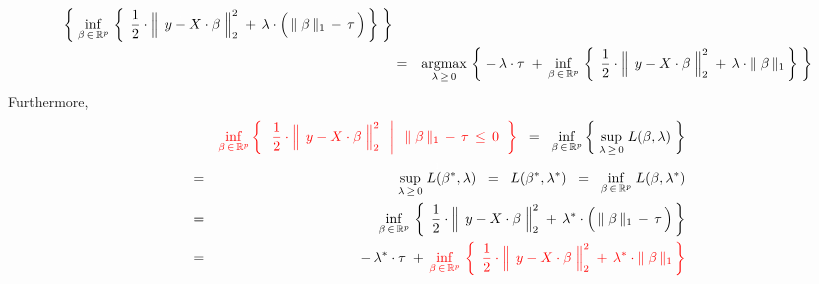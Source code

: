 \begin{theorem}
\begin{enumerate}
\begin{eqnarray*}
		\left\{\;
			\underset{\beta\,\in\,\Re^{p}}{\inf}\,
			\left\{\;\,
				\dfrac{1}{2}
				\cdot
				\left\Vert\;\, y \overset{{\color{white}.}}{-} X\cdot\beta \;\right\Vert_{2}^{2}
				\; + \,
				\lambda
				\cdot
				\left(\, \Vert\;\beta\,\Vert_{1} \, \overset{{\color{white}.}}{-} \, \tau \,\right)
				\,\right\}
			\;\right\}
	\\
	& = &
		\underset{\lambda\,\geq\,0}{\argmax}\,
		\left\{\;
			-\,\lambda\cdot\tau
			\; + \,
			\underset{\beta\,\in\,\Re^{p}}{\inf}\,
			\left\{\;\,
				\dfrac{1}{2}
				\cdot
				\left\Vert\;\, y \overset{{\color{white}.}}{-} X\cdot\beta \;\right\Vert_{2}^{2}
				\; + \,
				\lambda \cdot \Vert\;\beta\,\Vert_{1} 
				\,\right\}
			\;\right\}
	\end{eqnarray*}
	Furthermore,
	\begin{eqnarray*}
	&&
		{\color{red}\underset{\beta\,\in\,\Re^{p}}{\inf}
		\left\{\;\;
			\left.
			\dfrac{1}{2}
			\cdot
			\left\Vert\;\, y \overset{{\color{white}.}}{-} X\cdot\beta \;\right\Vert_{2}^{2}
			\;\;\,\right\vert\;\;
			\Vert\;\beta\,\Vert_{1} \, - \, \tau \, \leq \, 0
			\;\;\right\}}
	\;\; = \;\;
		\underset{\beta\,\in\,\Re^{p}}{\inf}
		\left\{\;
			\underset{\lambda\,\geq\,0}{\sup}\; L(\beta,\lambda)
			\;\right\}
	\\
	& = &
		\overset{{\color{white}1}}{\underset{\lambda\,\geq\,0}{\sup}\; L(\beta^{*},\lambda)}
	\;\; = \;\;
		L(\beta^{*},\lambda^{*})
	\;\; = \;\;
		\underset{\beta\,\in\,\Re^{p}}{\inf}\; L(\beta,\lambda^{*})
	\\
	& = &
		\underset{\beta\,\in\,\Re^{p}}{\inf}\,
		\left\{\;\,
			\dfrac{1}{2}
			\cdot
			\left\Vert\;\, y \overset{{\color{white}.}}{-} X\cdot\beta \;\right\Vert_{2}^{2}
			\; + \,
			\lambda^{*}
			\cdot
			\left(\, \Vert\;\beta\,\Vert_{1} \, \overset{{\color{white}.}}{-} \, \tau \,\right) \,\right\}
	\\
	& = &
		-\,\lambda^{*}\cdot\tau
		\; + \,
		{\color{red}\underset{\beta\,\in\,\Re^{p}}{\inf}\,
		\left\{\;\,
			\dfrac{1}{2}
			\cdot
			\left\Vert\;\, y \overset{{\color{white}.}}{-} X\cdot\beta \;\right\Vert_{2}^{2}
			\; + \,
			\lambda^{*} \cdot \Vert\;\beta\,\Vert_{1} 
			\,\right\}}
	\end{eqnarray*}
\end{enumerate}
\end{theorem}


\renewcommand{\theenumi}{\roman{enumi}}
\renewcommand{\labelenumi}{\textnormal{(\theenumi)}$\;\;$}

